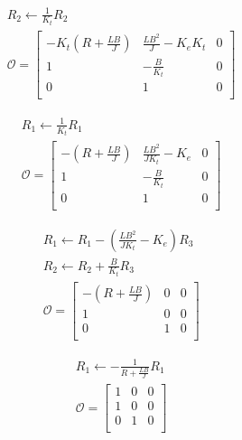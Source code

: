 \begin{equation*}
  \begin{aligned}
    &R_2\leftarrow \tfrac{1}{K_t} R_2\\
    &\mathcal{O} = 
    \begin{bmatrix}
    -K_t\left(R + \tfrac{LB}{J}\right) & \tfrac{LB^2}{J} - K_e K_t & 0 \\
    1                    & -\tfrac{B}{K_t}         & 0 \\
    0                    &  1                     & 0 \\
    \end{bmatrix}
  \end{aligned}
\end{equation*}

\begin{equation*}
  \begin{aligned}
    &R_1\leftarrow \tfrac{1}{K_t} R_1\\
    &\mathcal{O} = 
    \begin{bmatrix}
      -\left(R + \tfrac{LB}{J}\right) & \tfrac{LB^2}{JK_t} - K_e  & 0 \\
    1                    & -\tfrac{B}{K_t}         & 0 \\
    0                    &  1                     & 0 \\
    \end{bmatrix}
  \end{aligned}
\end{equation*}

\begin{equation*}
  \begin{aligned}
    &R_1\leftarrow R_1 - \left(\tfrac{LB^2}{JK_t} - K_e\right) R_3\\
    &R_2\leftarrow R_2 + \tfrac{B}{K_t} R_3\\
    &\mathcal{O} = 
    \begin{bmatrix}
      -\left(R + \tfrac{LB}{J}\right) & 0                     & 0 \\
    1                    &  0                     & 0 \\
    0                    &  1                     & 0 \\
    \end{bmatrix}
  \end{aligned}
\end{equation*}

\begin{equation*}
  \begin{aligned}
    &R_1\leftarrow -\tfrac{1}{R + \tfrac{LB}{J}} R_1\\
    &\mathcal{O} = 
    \begin{bmatrix}
    1                    &  0                     & 0 \\
    1                    &  0                     & 0 \\
    0                    &  1                     & 0 \\
    \end{bmatrix}
  \end{aligned}
\end{equation*}

